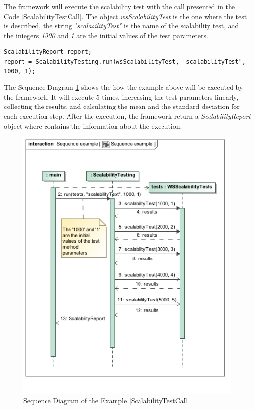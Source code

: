 The framework will execute the scalability test with the call presented in the Code \ref{ScalabilityTestCall}. The object \emph{wsScalabilityTest} is the one where the test is described, the string \emph{"scalabilityTest"} is the name of the scalability test, and the integers \emph{1000} and \emph{1} are the initial values of the test parameters.
\begin{lstlisting}
ScalabilityReport report;
report = ScalabilityTesting.run(wsScalabilityTest, "scalabilityTest", 1000, 1);
\end{lstlisting}

The Sequence Diagram \ref{sequenceDiagramExample} shows the how the example above will be executed by the framework. It will execute 5 times, increasing the test parameters linearly, collecting the results, and calculating the mean and the standard deviation for each execution step. After the execution, the framework return a \emph{ScalabilityReport} object where contains the information about the execution.

\begin{figure}[hbt]
\begin{center}
	\includegraphics[scale=0.7]{images/sequenceExample.jpg}
\caption{Sequence Diagram of the Example \ref{ScalabilityTestCall}}
\label{sequenceDiagramExample}
\end{center}
\end{figure}

